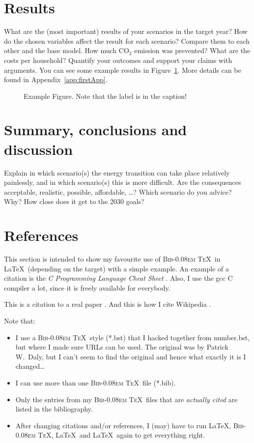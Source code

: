 \documentclass[11pt]{article}  %
\DeclareRobustCommand{\BibTeX}{{\normalfont\scshape Bib\kern-0.08em \TeX}}
\begin{document}
\section{Results}
\label{sec:results}

What are the (most important) results of your scenarios in the target year?
How do the chosen variables affect the result for each scenario?  Compare them to each other and the
base model. How much CO$_2$ emission was prevented? What are the costs per household?  Quantify your
outcomes and support your claims with arguments.  You can see some example results in Figure~\ref{fig:SRES}.
More details can be found in Appendix~\ref{app:firstApp}.

\begin{figure}
  \centering
  \caption{Example Figure.  Note that the label is in the caption!
    \label{fig:SRES}
  }
\end{figure}


\section{Summary, conclusions and discussion}
\label{sec:conclusions}

Explain in which scenario(s) the energy transition can take place relatively painlessly, and in which
scenario(s) this is more difficult. Are the consequences acceptable, realistic, possible, affordable, \ldots?
Which scenario do you advice? Why?  How close does it get to the 2030 goals?


\section{References}

This section is intended to show my favourite use of \BibTeX\ in \LaTeX\ (depending on the target) with a
simple example.  An example of a citation is the \emph{C Programming Language Cheat Sheet} \cite{Choudhary}.
Also, I use the gcc C compiler \cite{gcc} a lot, since it is freely available for everybody.

This is a citation to a real paper \cite{leung1980scheduling}.  And this is how I cite Wikipedia
\cite{wiki:Cron}.

Note that:
\begin{itemize}
\item I use a \BibTeX\ style (*.bst) that I hacked together from number.bst, but where I made sure URLs can be
  used.  The original was by Patrick W.\ Daly, but I can't seem to find the original and hence what exactly it
  is I changed\ldots
\item I can use more than one \BibTeX\ file (*.bib).
\item Only the entries from my \BibTeX\ files that are \emph{actually cited} are listed in the bibliography.
\item After changing citations and/or references, I (may) have to run \LaTeX, \BibTeX, \LaTeX\ and \LaTeX\
  again to get everything right.
\end{itemize}
\end{document}
